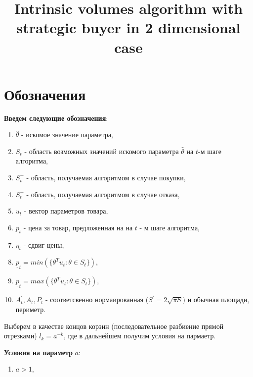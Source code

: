 \documentclass[12 pt, russian]{article}
\title{Intrinsic volumes algorithm with  strategic buyer in 2 dimensional case}
\begin{document}
\maketitle

\section{Обозначения}
\textbf{Введем следующие обозначения}:
\begin{enumerate}
    \item $\hat{\theta}$ - искомое значение параметра,
    \item $S_t$ - область возможных значений искомого параметра $\hat{\theta}$ на $t$-м шаге алгоритма,
    \item $S^{+}_t$ - область, получаемая алгоритмом в случае покупки,
    \item $S^{-}_t$ - область, получаемая алгоритмом в случае отказа,
    \item $u_t$ - вектор параметров товара,
    \item $p_t$ - цена за товар, предложенная на на $t$ - м шаге алгоритма,
    \item $\eta_t$ - сдвиг цены,
    \item $\underline{p}_t = min(\{\theta^T u_t: \theta \in S_t\})$,
    \item $\underline{p}_t = max(\{\theta^T u_t: \theta \in S_t\})$,
    \item $A^{'}_t, A_t, P_t$ - соответсвенно нормаированная ($S^{'} = 2\sqrt{\pi S})$ и обычная площади, периметр.
\end{enumerate}

Выберем в качестве концов корзин (последовательное разбиение прямой отрезками) $l_k = a^{-k}$, где в дальнейшем получим условия на пармаетр.

\textbf{Условия на параметр} $a$:
\begin{enumerate}
    \item $a > 1$,
\end{enumerate}
\end{document}
